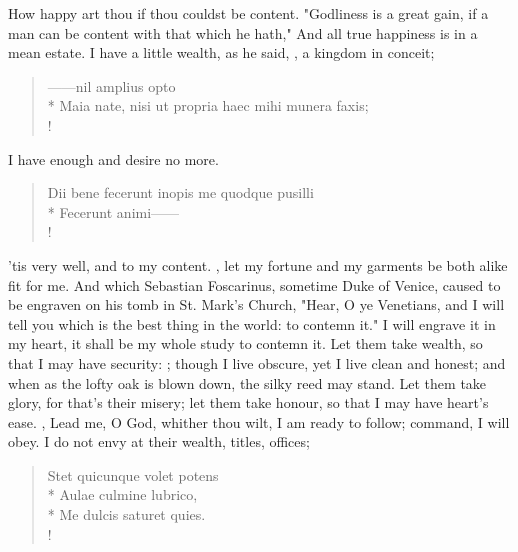 {How happy art thou if thou couldst be content. "Godliness is a great gain, if a man can be content with that which he hath,"  And all true happiness is in a mean estate. I have a little wealth, as he said, , a kingdom in conceit;

\begin{latin}
\begin{verse}%
------nil amplius opto\\*
Maia nate, nisi ut propria haec mihi munera faxis;\\!
\end{verse}%
\end{latin}

I have enough and desire no more.

\begin{latin}
\begin{verse}%
Dii bene fecerunt inopis me quodque pusilli\\*
Fecerunt animi------\\!
\end{verse}%
\end{latin}

'tis very well, and to my content. , let my fortune and my garments be both alike fit for me. And which Sebastian Foscarinus, sometime Duke of Venice, caused to be engraven on his tomb in St. Mark's Church, "Hear, O ye Venetians, and I will tell you which is the best thing in the world: to contemn it." I will engrave it in my heart, it shall be my whole study to contemn it. Let them take wealth,  so that I may have security: ; though I live obscure, yet I live clean and honest; and when as the lofty oak is blown down, the silky reed may stand. Let them take glory, for that's their misery; let them take honour, so that I may have heart's ease. , \etc{} Lead me, O God, whither thou wilt, I am ready to follow; command, I will obey. I do not envy at their wealth, titles, offices;

\begin{latin}
\begin{verse}%
Stet quicunque volet potens\\*
Aulae culmine lubrico,\\*
Me dulcis saturet quies.\\!
\end{verse}%
\end{latin}

}
